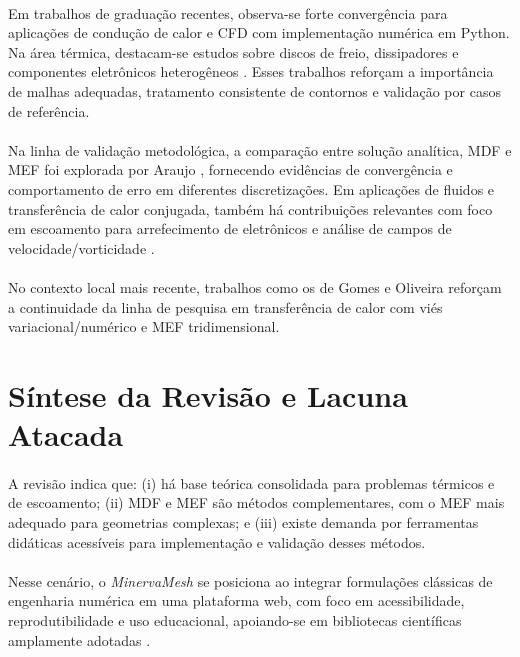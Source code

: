\paragraph{}Em trabalhos de graduação recentes, observa-se forte convergência para aplicações de condução de calor e CFD com implementação numérica em Python. Na área térmica, destacam-se estudos sobre discos de freio, dissipadores e componentes eletrônicos heterogêneos \cite{Aguiar2020,Alves2021,Ferreira2022,Pinheiro2022,Capitanio2023,Miranda2023,Teixeira2023,Oliveira2025}. Esses trabalhos reforçam a importância de malhas adequadas, tratamento consistente de contornos e validação por casos de referência.

\paragraph{}Na linha de validação metodológica, a comparação entre solução analítica, MDF e MEF foi explorada por Araujo \cite{Araujo2022}, fornecendo evidências de convergência e comportamento de erro em diferentes discretizações. Em aplicações de fluidos e transferência de calor conjugada, também há contribuições relevantes com foco em escoamento para arrefecimento de eletrônicos e análise de campos de velocidade/vorticidade \cite{Florentino2022,Santos2022,SilvaJessica2020,Amaral2020,GomesMatheus2021}.

\paragraph{}No contexto local mais recente, trabalhos como os de Gomes \cite{GomesYuri2025} e Oliveira \cite{Oliveira2025} reforçam a continuidade da linha de pesquisa em transferência de calor com viés variacional/numérico e MEF tridimensional.

\section{Síntese da Revisão e Lacuna Atacada}

\paragraph{}A revisão indica que: (i) há base teórica consolidada para problemas térmicos e de escoamento; (ii) MDF e MEF são métodos complementares, com o MEF mais adequado para geometrias complexas; e (iii) existe demanda por ferramentas didáticas acessíveis para implementação e validação desses métodos.

\paragraph{}Nesse cenário, o \textit{MinervaMesh} se posiciona ao integrar formulações clássicas de engenharia numérica em uma plataforma web, com foco em acessibilidade, reprodutibilidade e uso educacional, apoiando-se em bibliotecas científicas amplamente adotadas \cite{Harris2020,PyScript2023}.
